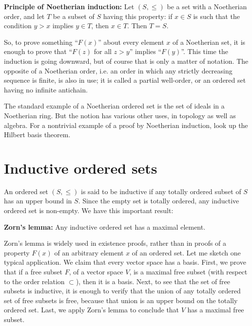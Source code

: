 \documentclass{article}
\begin{document}
\noindent
\textbf{Principle of Noetherian induction:} Let $(S,\le)$ be
a set with a Noetherian order, and let $T$ be a subset of $S$ having
this property: if $x \in S$ is such that the condition $y>x$ implies
$y\in T$, then $x\in T$. Then $T=S$.

So, to prove something ``$F(x)$'' about every element $x$ of a Noetherian set,
it is enough to prove that ``$F(z)$ for all $z>y$'' implies ``$F(y)$''.
This time the induction is going downward, but of course that is only a
matter of notation.
The opposite of a Noetherian order, i.e. an order in which any strictly
decreasing sequence is finite, is also in use; it is called a partial
well-order, or an ordered set having no infinite antichain.

The standard example of a Noetherian ordered set is the set of ideals
in a Noetherian ring.
But the notion has various other uses, in topology
as well as algebra.
For a nontrivial example of a proof by Noetherian
induction, look up the Hilbert basis theorem.

\section{Inductive ordered sets}
An ordered set $(S,\le)$ is said to be inductive if any totally ordered subset
of $S$ has an upper bound in $S$.
Since the empty set is totally ordered,
any inductive ordered set is non-empty.
We have this important result:

\noindent
\textbf{Zorn's lemma:} Any inductive ordered set has a maximal element.

Zorn's lemma is widely used in existence proofs, rather than in proofs
of a property $F(x)$ of an arbitrary element $x$ of an ordered set.
Let me sketch one typical application.
We claim that every vector space has a basis.
First, we prove that if a free subset $F$, of a vector space $V$,
is a maximal free subset (with respect to the order relation
$\subset$), then it is a basis.
Next, to see that the set of free subsets is inductive, it is enough
to verify that the union of any totally ordered set of free subsets
is free, because that union is an upper bound on the totally ordered set.
Last, we apply Zorn's lemma to conclude that $V$ has a maximal free
subset.
\end{document}
